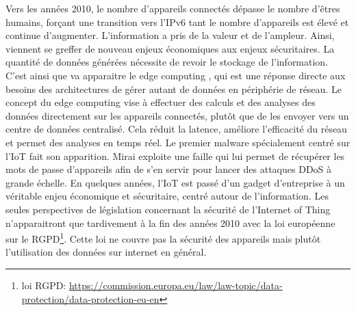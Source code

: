 Vers les années 2010, le nombre d'appareils connectés dépasse le nombre d'êtres humains, forçant une transition vers l'IPv6 tant le nombre d'appareils est élevé et continue d'augmenter. L'information a pris de la valeur et de l'ampleur. Ainsi, viennent se greffer de nouveau enjeux économiques aux enjeux sécuritaires. La quantité de données générées nécessite de revoir le stockage de l'information. C'est ainsi que va apparaitre le edge computing \cite{edge}, qui est une réponse directe aux besoins des architectures de gérer autant de données en périphérie de réseau. Le concept du edge computing vise à effectuer des calculs et des analyses des données directement sur les appareils connectés, plutôt que de les envoyer vers un centre de données centralisé. Cela réduit la latence, améliore l'efficacité du réseau et permet des analyses en temps réel. Le premier malware spécialement centré sur l'\ac{IoT} fait son apparition. Mirai\cite{Mirai} exploite une faille qui lui permet de récupérer les mots de passe d'appareils afin de s'en servir pour lancer des attaques \ac{DDoS} à grande échelle. En quelques années, l'\ac{IoT} est passé d'un gadget d'entreprise à un véritable enjeu économique et sécuritaire, centré autour de l'information. Les seules perspectives de législation concernant la sécurité de l'Internet of Thing n'apparaitront que tardivement à la fin des années 2010 avec la loi européenne sur le \ac{RGPD}\footnote{loi RGPD: \href{https://commission.europa.eu/law/law-topic/data-protection/data-protection-eu_en}{{https://commission.europa.eu/law/law-topic/data-protection/data-protection-eu-en}}}. Cette loi ne couvre pas la sécurité des appareils mais plutôt l'utilisation des données sur internet en général.

\vspace{0.1cm}

